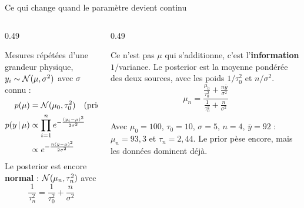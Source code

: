 \begin{frame}{Ce qui change quand le paramètre devient continu}
\begin{columns}[t]
\begin{column}{0.49\textwidth}
\begin{ebox}
Mesures répétées d'une grandeur physique, $y_i \sim \mathcal{N}(\mu, \sigma^2)$ avec
$\sigma$ connu :
\[
\begin{aligned}
p(\mu) &= \mathcal{N}(\mu_0, \tau_0^2) \quad\text{(prior)}\\
p(y \,\vert\, \mu) &\propto \prod_{i=1}^n e^{-\frac{(y_i-\mu)^2}{2\sigma^2}}\\
&\propto e^{-\frac{n(\bar y - \mu)^2}{2\sigma^2}}
\end{aligned}
\]
Le posterior est encore \textbf{normal} : $\mathcal{N}(\mu_n, \tau_n^2)$ avec
\[
\frac{1}{\tau_n^2} = \frac{1}{\tau_0^2} + \frac{n}{\sigma^2}
\]
\end{ebox}
\end{column}
\begin{column}{0.49\textwidth}
\begin{kbox}
Ce n'est pas $\mu$ qui s'additionne, c'est l'\textbf{information}
$1/$variance. Le posterior est la moyenne pondérée des deux sources,
avec les poids $1/\tau_0^2$ et $n/\sigma^2$.
\vspace{1mm}
\[
\mu_n = \frac{\frac{\mu_0}{\tau_0^2}+\frac{n\bar y}{\sigma^2}}{\frac{1}{\tau_0^2}+\frac{n}{\sigma^2}}
\]
\end{kbox}
\begin{ebox}[Chiffres]
Avec $\mu_0 = 100$, $\tau_0 = 10$, $\sigma = 5$, $n = 4$, $\bar y = 92$ :
$\mu_n = 93{,}3$ et $\tau_n = 2{,}44$.
Le prior pèse encore, mais les données dominent déjà.
\end{ebox}
\end{column}
\end{columns}
\end{frame}

